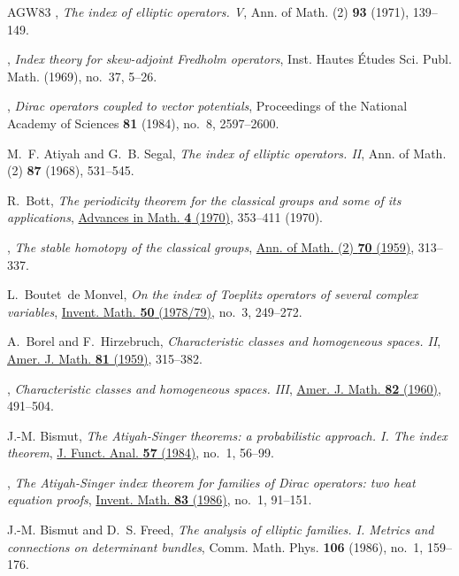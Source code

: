 \documentclass[11pt]{amsart}
\theoremstyle{definition}
\theoremstyle{remark}
\theoremstyle{plain}
\numberwithin{equation}{section}
\renewcommand{\:}{\colon}
\begin{document}
\begin{thebibliography}{AGW83}
\bysame, \emph{The index of elliptic operators. {V}}, Ann. of Math. (2)
  \textbf{93} (1971), 139--149.

\bysame, \emph{Index theory for skew-adjoint {F}redholm operators}, Inst.
  Hautes {\'E}tudes Sci. Publ. Math. (1969), no.~37, 5--26.

\bysame, \emph{Dirac operators coupled to vector potentials}, Proceedings of
  the National Academy of Sciences \textbf{81} (1984), no.~8, 2597--2600.

M.~F. Atiyah and G.~B. Segal, \emph{The index of elliptic operators. {II}},
  Ann. of Math. (2) \textbf{87} (1968), 531--545.

R.~Bott, \emph{The periodicity theorem for the classical groups and some of its
  applications}, \href{http://dx.doi.org/10.1016/0001-8708(70)90030-7}{Advances
  in Math. \textbf{4} (1970)}, 353--411 (1970).

\bysame, \emph{The stable homotopy of the classical groups},
  \href{http://dx.doi.org/10.2307/1970106}{Ann. of Math. (2) \textbf{70}
  (1959)}, 313--337.

L.~Boutet~de Monvel, \emph{On the index of {T}oeplitz operators of several
  complex variables}, \href{http://dx.doi.org/10.1007/BF01410080}{Invent. Math.
  \textbf{50} (1978/79)}, no.~3, 249--272.

A.~Borel and F.~Hirzebruch, \emph{Characteristic classes and homogeneous
  spaces. {II}}, \href{http://dx.doi.org/10.2307/2372747}{Amer. J. Math.
  \textbf{81} (1959)}, 315--382.

\bysame, \emph{Characteristic classes and homogeneous spaces. {III}},
  \href{http://dx.doi.org/10.2307/2372969}{Amer. J. Math. \textbf{82} (1960)},
  491--504.

J.-M. Bismut, \emph{The {A}tiyah-{S}inger theorems: a probabilistic approach.
  {I}. {T}he index theorem},
  \href{http://dx.doi.org/10.1016/0022-1236(84)90101-0}{J. Funct. Anal.
  \textbf{57} (1984)}, no.~1, 56--99.

\bysame, \emph{The {A}tiyah-{S}inger index theorem for families of {D}irac
  operators: two heat equation proofs},
  \href{http://dx.doi.org/10.1007/BF01388755}{Invent. Math. \textbf{83}
  (1986)}, no.~1, 91--151.

J.-M. Bismut and D.~S. Freed, \emph{The analysis of elliptic families. {I}.
  {M}etrics and connections on determinant bundles}, Comm. Math. Phys.
  \textbf{106} (1986), no.~1, 159--176.


\end{thebibliography}
\end{document}
